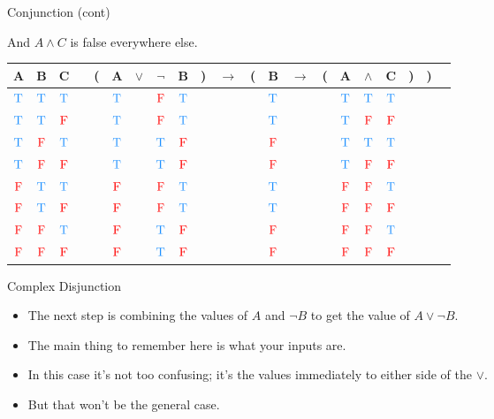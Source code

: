 \documentclass[
  ignorenonframetext,
]{beamer}
\providecommand{\tightlist}{%
  \setlength{\itemsep}{0pt}\setlength{\parskip}{0pt}}
\renewcommand{\,}{\text{, }}
\def\True{\textcolor{dodgerblue}{\text{T}}}
\def\False{\textcolor{red}{\text{F}}}
\begin{document}
\begin{frame}{Conjunction (cont)}
\protect\hypertarget{conjunction-cont}{}

And \(A \wedge C\) is false everywhere else.

\begin{center}
\bigskip
\begin{tabular}{@{ }c@{ }@{ }c@{ }@{ }c | c@{ }@{}c@{}@{ }c@{ }@{ }c@{ }@{ }c@{ }@{ }c@{ }@{}c@{}@{ }c@{ }@{}c@{}@{ }c@{ }@{ }c@{ }@{}c@{}@{ }c@{ }@{ }c@{ }@{ }c@{ }@{}c@{}@{}c@{}@{ }c}
A & B & C &  & ( & A & $\vee$ & $\neg$ & B & ) & $\rightarrow$ & ( & B & $\rightarrow$ & ( & A & $\wedge$ & C & ) & ) & \\
\hline 
 $\True$ & $\True$ & $\True$ &  &  & $\True$ && $\False$ & $\True$ &  &&  & $\True$ &&  & $\True$ & $\True$ & $\True$ &  &  & \\
 $\True$ & $\True$ & $\False$ &  &  & $\True$ && $\False$ & $\True$ &  &&  & $\True$ &&  & $\True$ & $\False$ & $\False$ &  &  & \\
 $\True$ & $\False$ & $\True$ &  &  & $\True$ && $\True$ & $\False$ &  &&  & $\False$ &&  & $\True$ & $\True$ & $\True$ &  &  & \\
 $\True$ & $\False$ & $\False$ &  &  & $\True$ && $\True$ & $\False$ &  &&  & $\False$ &&  & $\True$ & $\False$ & $\False$ &  &  & \\
 $\False$ & $\True$ & $\True$ &  &  & $\False$ && $\False$ & $\True$ &  &&  & $\True$ &&  & $\False$ & $\False$ & $\True$ &  &  & \\
 $\False$ & $\True$ & $\False$ &  &  & $\False$ && $\False$ & $\True$ &  &&  & $\True$ &&  & $\False$ & $\False$ & $\False$ &  &  & \\
 $\False$ & $\False$ & $\True$ &  &  & $\False$ && $\True$ & $\False$ &  &&  & $\False$ &&  & $\False$ & $\False$ & $\True$ &  &  & \\
 $\False$ & $\False$ & $\False$ &  &  & $\False$ && $\True$ & $\False$ &  &&  & $\False$ &&  & $\False$ & $\False$ & $\False$ &  &  & \\
\end{tabular}
\bigskip
\end{center}

\end{frame}

\begin{frame}{Complex Disjunction}
\protect\hypertarget{complex-disjunction}{}

\begin{itemize}
\tightlist
\item
  The next step is combining the values of \(A\) and \(\neg B\) to get
  the value of \(A \vee \neg B\).
\item
  The main thing to remember here is what your inputs are.
\item
  In this case it's not too confusing; it's the values immediately to
  either side of the \(\vee\).
\item
  But that won't be the general case.
\end{itemize}

\end{frame}
\end{document}
